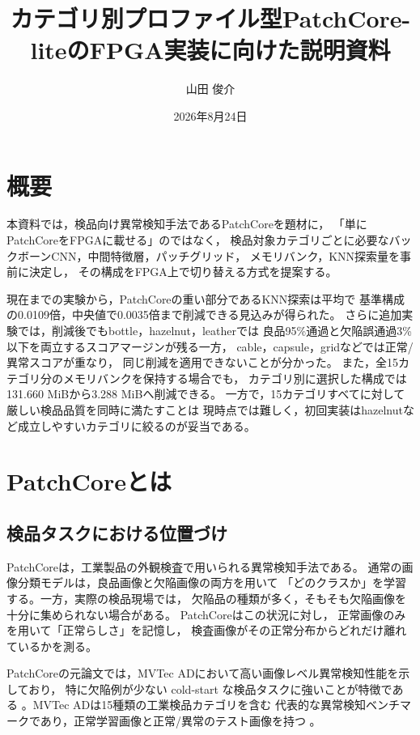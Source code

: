 \documentclass[uplatex,dvipdfmx,a4paper,11pt]{jsarticle}
\title{カテゴリ別プロファイル型PatchCore-liteのFPGA実装に向けた説明資料}
\author{山田 俊介}
\date{2026年8月24日}
\begin{document}
\maketitle

\section*{概要}

本資料では，検品向け異常検知手法であるPatchCoreを題材に，
「単にPatchCoreをFPGAに載せる」のではなく，
検品対象カテゴリごとに必要なバックボーンCNN，中間特徴層，パッチグリッド，
メモリバンク，KNN探索量を事前に決定し，
その構成をFPGA上で切り替える方式を提案する。

現在までの実験から，PatchCoreの重い部分であるKNN探索は平均で
基準構成の0.0109倍，中央値で0.0035倍まで削減できる見込みが得られた。
さらに追加実験では，削減後でもbottle，hazelnut，leatherでは
良品95\%通過と欠陥誤通過3\%以下を両立するスコアマージンが残る一方，
cable，capsule，gridなどでは正常/異常スコアが重なり，
同じ削減を適用できないことが分かった。
また，全15カテゴリ分のメモリバンクを保持する場合でも，
カテゴリ別に選択した構成では131.660 MiBから3.288 MiBへ削減できる。
一方で，15カテゴリすべてに対して厳しい検品品質を同時に満たすことは
現時点では難しく，初回実装はhazelnutなど成立しやすいカテゴリに絞るのが妥当である。

\section{PatchCoreとは}

\subsection{検品タスクにおける位置づけ}

PatchCoreは，工業製品の外観検査で用いられる異常検知手法である。
通常の画像分類モデルは，良品画像と欠陥画像の両方を用いて
「どのクラスか」を学習する。一方，実際の検品現場では，
欠陥品の種類が多く，そもそも欠陥画像を十分に集められない場合がある。
PatchCoreはこの状況に対し，
正常画像のみを用いて「正常らしさ」を記憶し，
検査画像がその正常分布からどれだけ離れているかを測る。

PatchCoreの元論文では，MVTec ADにおいて高い画像レベル異常検知性能を示しており，
特に欠陥例が少ない cold-start な検品タスクに強いことが特徴である
\cite{patchcore_cvpr}。MVTec ADは15種類の工業検品カテゴリを含む
代表的な異常検知ベンチマークであり，正常学習画像と正常/異常のテスト画像を持つ
\cite{mvtec_ad}。
\end{document}
